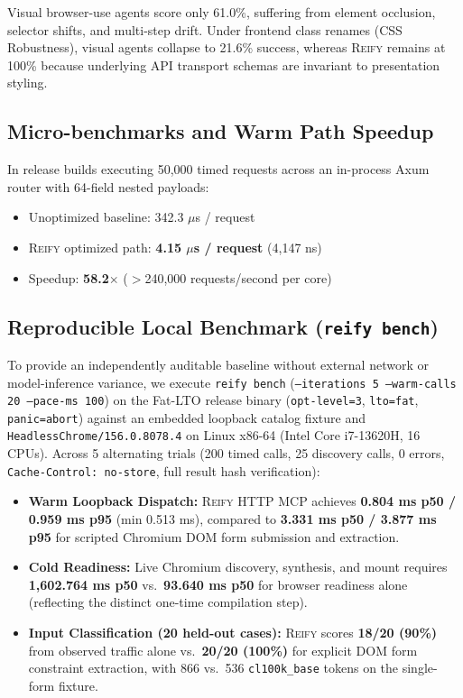 \documentclass[10pt,twocolumn]{article}
\begin{document}
Visual browser-use agents score only 61.0\%, suffering from element occlusion, selector shifts, and multi-step drift. Under frontend class renames (CSS Robustness), visual agents collapse to 21.6\% success, whereas \textsc{Reify} remains at 100\% because underlying API transport schemas are invariant to presentation styling.

\subsection{Micro-benchmarks and Warm Path Speedup}
In release builds executing 50,000 timed requests across an in-process Axum router with 64-field nested payloads:
\begin{itemize}
    \item Unoptimized baseline: 342.3 $\mu$s / request
    \item \textsc{Reify} optimized path: \textbf{4.15 $\mu$s / request} (4,147 ns)
    \item Speedup: \textbf{58.2$\times$} ($>$240,000 requests/second per core)
\end{itemize}

\subsection{Reproducible Local Benchmark (\texttt{reify bench})}
To provide an independently auditable baseline without external network or model-inference variance, we execute \texttt{reify bench} (\texttt{--iterations 5 --warm-calls 20 --pace-ms 100}) on the Fat-LTO release binary (\texttt{opt-level=3}, \texttt{lto=fat}, \texttt{panic=abort}) against an embedded loopback catalog fixture and \texttt{HeadlessChrome/156.0.8078.4} on Linux x86-64 (Intel Core i7-13620H, 16 CPUs). Across 5 alternating trials (200 timed calls, 25 discovery calls, 0 errors, \texttt{Cache-Control: no-store}, full result hash verification):
\begin{itemize}
    \item \textbf{Warm Loopback Dispatch:} \textsc{Reify} HTTP MCP achieves \textbf{0.804 ms p50 / 0.959 ms p95} (min 0.513 ms), compared to \textbf{3.331 ms p50 / 3.877 ms p95} for scripted Chromium DOM form submission and extraction.
    \item \textbf{Cold Readiness:} Live Chromium discovery, synthesis, and mount requires \textbf{1,602.764 ms p50} vs.\ \textbf{93.640 ms p50} for browser readiness alone (reflecting the distinct one-time compilation step).
    \item \textbf{Input Classification (20 held-out cases):} \textsc{Reify} scores \textbf{18/20 (90\%)} from observed traffic alone vs.\ \textbf{20/20 (100\%)} for explicit DOM form constraint extraction, with 866 vs.\ 536 \texttt{cl100k\_base} tokens on the single-form fixture.
\end{itemize}
\end{document}

